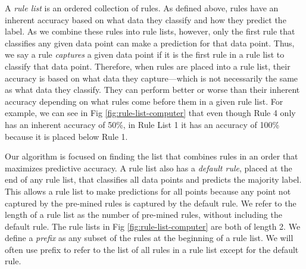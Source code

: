 A \textit{rule list} is an ordered collection of rules.
As defined above, rules have an inherent accuracy based on what data they classify and how they predict the label.
As we combine these rules into rule lists, however, only the first rule that classifies any given data point can make a prediction for that data point.
Thus, we say a rule \textit{captures} a given data point if it is the first rule in a rule list to classify that data point.
Therefore, when rules are placed into a rule list, their accuracy is based on what data they capture---which is not necessarily the same as what data they classify.
They can perform better or worse than their inherent accuracy depending on what rules come before them in a given rule list.
For example, we can see in Fig \ref{fig:rule-list-computer} that even though Rule 4 only has an inherent accuracy of 50\%, in Rule List 1 it has an accuracy of 100\% because it is placed below Rule 1.

Our algorithm is focused on finding the list that combines rules in an order that maximizes predictive accuracy.
A rule list also has a \textit{default rule}, placed at the end of any rule list, that classifies all data points and predicts the majority label.
This allows a rule list to make predictions for all points because any point not captured by the pre-mined rules is captured by the default rule.
We refer to the length of a rule list as the number of pre-mined rules, without including the default rule.
The rule lists in Fig \ref{fig:rule-list-computer} are both of length 2.
We define a \textit{prefix} as any subset of the rules at the beginning of a rule list.
We will often use prefix to refer to the list of all rules in a rule list except for the default rule.

